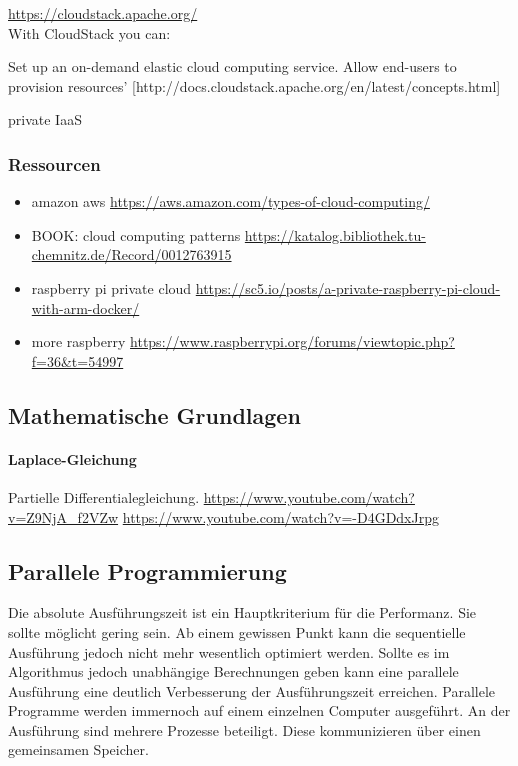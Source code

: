\documentclass[a4paper,10pt]{article}
\numberwithin{figure}{section}
\numberwithin{table}{section}
\begin{document}
\url{https://cloudstack.apache.org/}\\

With CloudStack you can:

Set up an on-demand elastic cloud computing service.
Allow end-users to provision resources' [http://docs.cloudstack.apache.org/en/latest/concepts.html]

private
IaaS

\subsubsection{Ressourcen}

\begin{itemize}
 \item amazon aws \url{https://aws.amazon.com/types-of-cloud-computing/}
 \item BOOK: cloud computing patterns \url{https://katalog.bibliothek.tu-chemnitz.de/Record/0012763915}
 \item raspberry pi private cloud \url{https://sc5.io/posts/a-private-raspberry-pi-cloud-with-arm-docker/}
 \item more raspberry \url{https://www.raspberrypi.org/forums/viewtopic.php?f=36&t=54997}
\end{itemize}

\subsection{Mathematische Grundlagen}

\paragraph{Laplace-Gleichung}
Partielle Differentialegleichung.
\url{https://www.youtube.com/watch?v=Z9NjA_f2VZw}
\url{https://www.youtube.com/watch?v=-D4GDdxJrpg}

\subsection{Parallele Programmierung}

Die absolute Ausführungszeit ist ein Hauptkriterium für die Performanz.
Sie sollte möglicht gering sein.
Ab einem gewissen Punkt kann die sequentielle Ausführung jedoch nicht mehr wesentlich optimiert werden.
Sollte es im Algorithmus jedoch unabhängige Berechnungen geben kann eine parallele Ausführung eine deutlich Verbesserung der Ausführungszeit erreichen.
Parallele Programme werden immernoch auf einem einzelnen Computer ausgeführt.
An der Ausführung sind mehrere Prozesse beteiligt.
Diese kommunizieren über einen gemeinsamen Speicher.
\end{document}
